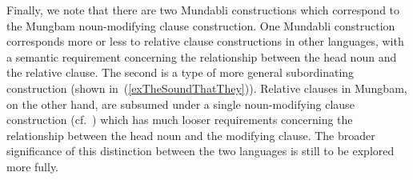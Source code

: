 \documentclass[10pt,twoside]{article}
\newcommand{\gl}[1]{`#1'}
\newcommand{\citepp}[2]{(\citealp{#1}:\,{#2})}
\newcommand{\pref}[1]{(\ref{#1})}
\begin{document}
{Finally, we note that there are two Mundabli
constructions which correspond to the Mungbam noun-modifying
clause construction.
One Mundabli construction corresponds 
more or less to relative clause constructions in other
languages, with a semantic requirement concerning the
relationship between the head noun and the relative clause.
The second 
is a type of more general subordinating construction
(shown in~\pref{exTheSoundThatThey}).
Relative clauses in Mungbam, on the other hand,
 are subsumed under
a single noun-modifying clause construction (cf.~\cite{comrie:1998})
which has much looser requirements concerning the relationship
between the head noun and the modifying clause.
The broader significance of this distinction between the
two languages is still to be explored more fully.}
%
%
%
%
\end{document}
